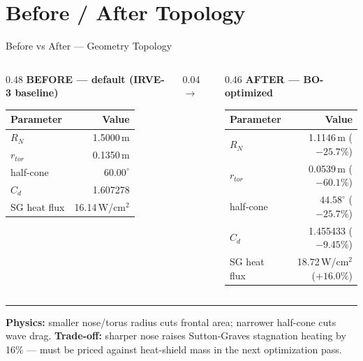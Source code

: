 \documentclass[aspectratio=169,10pt]{beamer}
\begin{document}
\section{Before / After Topology}

\begin{frame}{Before vs After --- Geometry Topology}
  \begin{columns}[T]
    \begin{column}{0.48\textwidth}
      \textbf{BEFORE --- default (IRVE-3 baseline)}\\[2pt]
      \scriptsize
      \begin{tabular}{@{}lr@{}}
        \toprule
        Parameter & Value \\
        \midrule
        $R_N$ & 1.5000\,m \\
        $r_{tor}$ & 0.1350\,m \\
        half-cone & $60.00^\circ$ \\
        $C_d$ & 1.607278 \\
        SG heat flux & 16.14\,W/cm$^2$ \\
        \bottomrule
      \end{tabular}
    \end{column}
    \begin{column}{0.04\textwidth}
      \centering $\rightarrow$
    \end{column}
    \begin{column}{0.46\textwidth}
      \textbf{AFTER --- BO-optimized}\\[2pt]
      \scriptsize
      \begin{tabular}{@{}lr@{}}
        \toprule
        Parameter & Value \\
        \midrule
        $R_N$ & 1.1146\,m ($-25.7\%$) \\
        $r_{tor}$ & 0.0539\,m ($-60.1\%$) \\
        half-cone & $44.58^\circ$ ($-25.7\%$) \\
        $C_d$ & 1.455433 ($-9.45\%$) \\
        SG heat flux & 18.72\,W/cm$^2$ ($+16.0\%$) \\
        \bottomrule
      \end{tabular}
    \end{column}
  \end{columns}
  \vspace{6pt}
  \hrule
  \vspace{4pt}
  \textbf{Physics:} smaller nose/torus radius cuts frontal area; narrower
  half-cone cuts wave drag. \textbf{Trade-off:} sharper nose raises
  Sutton-Graves stagnation heating by 16\% --- must be priced against
  heat-shield mass in the next optimization pass.
\end{frame}
\end{document}

